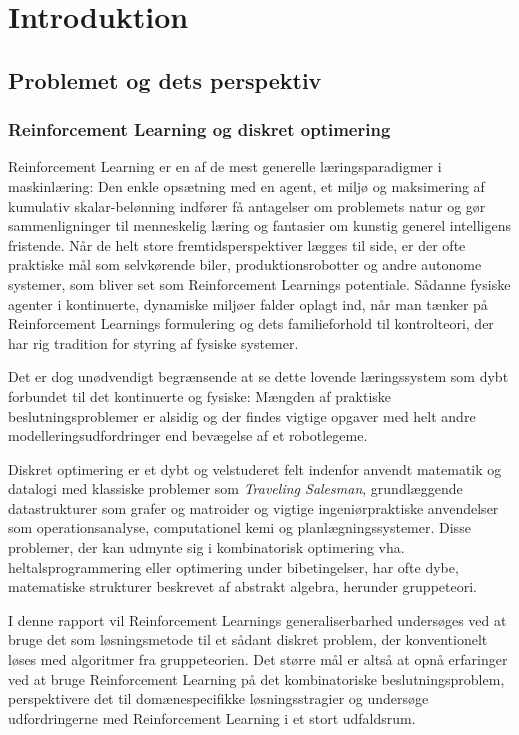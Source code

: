 \documentclass[../main.tex]{subfiles}
\begin{document}
\chapter{Introduktion}
\section{Problemet og dets perspektiv}
\subsection*{Reinforcement Learning og diskret optimering}
Reinforcement Learning er en af de mest generelle læringsparadigmer i maskinlæring: 
Den enkle opsætning med en agent, et miljø og maksimering af kumulativ skalar-belønning indfører få antagelser om problemets natur og gør sammenligninger til menneskelig læring og fantasier om kunstig generel intelligens fristende.
Når de helt store fremtidsperspektiver lægges til side, er der ofte praktiske mål som selvkørende biler, produktionsrobotter og andre autonome systemer, som bliver set som Reinforcement Learnings potentiale.
Sådanne fysiske agenter i kontinuerte, dynamiske miljøer falder oplagt ind, når man tænker på Reinforcement Learnings formulering og dets familieforhold til kontrolteori, der har rig tradition for styring af fysiske systemer. 

Det er dog unødvendigt begrænsende at se dette lovende læringssystem som dybt forbundet til det kontinuerte og fysiske: Mængden af praktiske beslutningsproblemer er  alsidig og der findes vigtige opgaver med helt andre modelleringsudfordringer end bevægelse af et robotlegeme.

Diskret optimering er et dybt og velstuderet felt indenfor anvendt matematik og datalogi med klassiske problemer som \textit{Traveling Salesman}, grundlæggende datastrukturer som grafer og matroider og vigtige ingeniørpraktiske anvendelser som operationsanalyse, computationel kemi og planlægningssystemer. 
Disse problemer, der kan udmynte sig i kombinatorisk optimering vha. heltalsprogrammering eller optimering under bibetingelser, har ofte dybe, matematiske strukturer beskrevet af abstrakt algebra, herunder gruppeteori.
 
I denne rapport vil Reinforcement Learnings generaliserbarhed undersøges ved at bruge det som løsningsmetode til et sådant  diskret problem, der konventionelt løses med algoritmer fra gruppeteorien.
Det større mål er altså at opnå erfaringer ved at bruge Reinforcement Learning på det kombinatoriske beslutningsproblem, perspektivere det til domænespecifikke løsningsstragier og undersøge udfordringerne med Reinforcement Learning i et stort udfaldsrum. 
\end{document}

